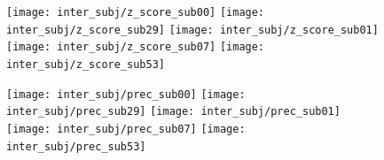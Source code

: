 \documentclass[5p]{elsarticle}
\begin{document}
\begin{figure}
\begin{preview}
    \hspace*{.5ex}%
    \texttt{[image: inter\_subj/z\_score\_sub00]}%
    \hspace*{-.2ex}%
    \texttt{[image: inter\_subj/z\_score\_sub29]}%
    \hspace*{-.2ex}%
    \texttt{[image: inter\_subj/z\_score\_sub01]}%
    \hspace*{-.2ex}%
    \texttt{[image: inter\_subj/z\_score\_sub07]}%
    \hspace*{-.2ex}%
    \texttt{[image: inter\_subj/z\_score\_sub53]}%
    \hspace*{.1ex}%

    \hspace*{.5ex}%
    \texttt{[image: inter\_subj/prec\_sub00]}%
    \hspace*{-.2ex}%
    \texttt{[image: inter\_subj/prec\_sub29]}%
    \hspace*{-.2ex}%
    \texttt{[image: inter\_subj/prec\_sub01]}%
    \hspace*{-.2ex}%
    \texttt{[image: inter\_subj/prec\_sub07]}%
    \hspace*{-.2ex}%
    \texttt{[image: inter\_subj/prec\_sub53]}%
    \hspace*{.1ex}%


\end{preview}
\end{figure}
\end{document}
